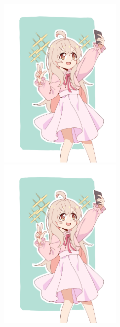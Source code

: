 \begin{figure}[!ht]
	\centering
	\begin{minipage}[b]{.4\linewidth}
		\centering
		\includegraphics[width=6cm]{图片/sample.jpg}
	\end{minipage}
	\qquad
	\begin{minipage}[b]{.4\linewidth}
		\centering
		\includegraphics[width=6cm]{图片/sample.jpg}
	\end{minipage}
\end{figure}

